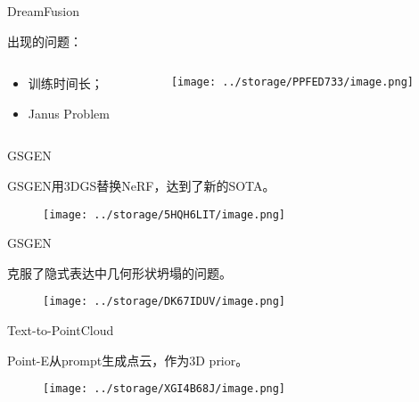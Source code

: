 \documentclass[dark]{sintefbeamer}
\begin{document}
\begin{frame}[fragile]{DreamFusion}

  出现的问题：
  \begin{columns}
    \begin{column}{0.5\textwidth}
      \begin{itemize}
        \item 训练时间长；
        \item Janus Problem
      \end{itemize}
    \end{column}
  
    \begin{column}{0.5\textwidth}
      \begin{figure}
        \texttt{[image: ../storage/PPFED733/image.png]}
      \end{figure}
    \end{column}
  \end{columns}
  
\end{frame}

\begin{frame}[fragile]{GSGEN}

  GSGEN\cite{chenTextto3DUsingGaussian2023}用3DGS替换NeRF，达到了新的SOTA。

  \begin{figure}
    \texttt{[image: ../storage/5HQH6LIT/image.png]}
  \end{figure}

\end{frame}

\begin{frame}[fragile]{GSGEN}

  克服了隐式表达中几何形状坍塌的问题。

  \begin{figure}
    \texttt{[image: ../storage/DK67IDUV/image.png]}
  \end{figure}

\end{frame}

\begin{frame}[fragile]{Text-to-PointCloud}

  Point-E\cite{nicholPointESystemGenerating2022}从prompt生成点云，作为3D prior。

  \begin{figure}
    \texttt{[image: ../storage/XGI4B68J/image.png]}
  \end{figure}

\end{frame}
\end{document}
